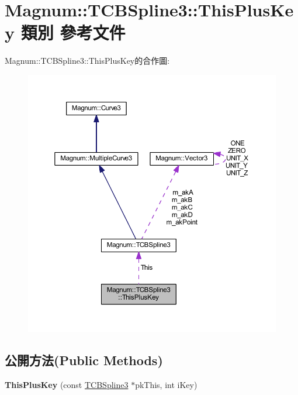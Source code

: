 \hypertarget{class_magnum_1_1_t_c_b_spline3_1_1_this_plus_key}{}\section{Magnum\+:\+:T\+C\+B\+Spline3\+:\+:This\+Plus\+Key 類別 參考文件}
\label{class_magnum_1_1_t_c_b_spline3_1_1_this_plus_key}


Magnum\+:\+:T\+C\+B\+Spline3\+:\+:This\+Plus\+Key的合作圖\+:\nopagebreak
\begin{figure}[H]
\begin{center}
\leavevmode
\includegraphics[width=350pt]{class_magnum_1_1_t_c_b_spline3_1_1_this_plus_key__coll__graph}
\end{center}
\end{figure}
\subsection*{公開方法(Public Methods)}
\begin{DoxyCompactItemize}
\item 
{\bfseries This\+Plus\+Key} (const \hyperlink{class_magnum_1_1_t_c_b_spline3}{T\+C\+B\+Spline3} $\ast$pk\+This, int i\+Key)\hypertarget{class_magnum_1_1_t_c_b_spline3_1_1_this_plus_key_a18eea4e4f8a62e747722d6f0be422633}{}\label{class_magnum_1_1_t_c_b_spline3_1_1_this_plus_key_a18eea4e4f8a62e747722d6f0be422633}

\end{DoxyCompactItemize}
